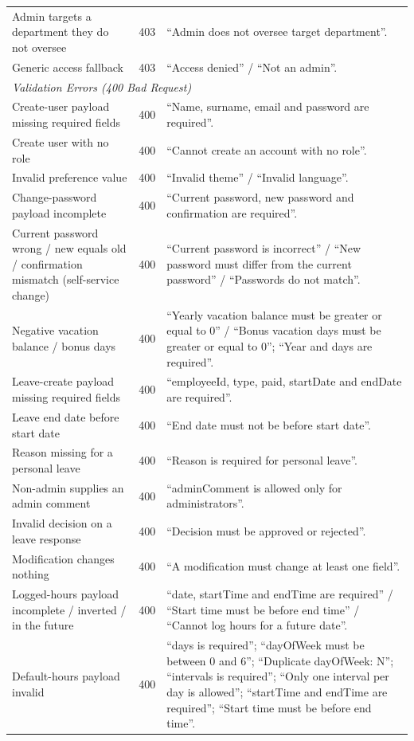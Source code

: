 \documentclass[11pt,a4paper]{article}
\begin{document}
\begin{longtable}{p{6cm} p{1.5cm} p{6cm}}
Admin targets a department they do not oversee & 403 & ``Admin does not oversee target department''. \\
Generic access fallback & 403 & ``Access denied'' / ``Not an admin''. \\
\midrule
\multicolumn{3}{l}{\textit{Validation Errors (400 Bad Request)}} \\
\midrule
Create-user payload missing required fields & 400 & ``Name, surname, email and password are required''. \\
Create user with no role & 400 & ``Cannot create an account with no role''. \\
Invalid preference value & 400 & ``Invalid theme'' / ``Invalid language''. \\
Change-password payload incomplete & 400 & ``Current password, new password and confirmation are required''. \\
Current password wrong / new equals old / confirmation mismatch (self-service change) & 400 & ``Current password is incorrect'' / ``New password must differ from the current password'' / ``Passwords do not match''. \\
Negative vacation balance / bonus days & 400 & ``Yearly vacation balance must be greater or equal to 0'' / ``Bonus vacation days must be greater or equal to 0''; ``Year and days are required''. \\
Leave-create payload missing required fields & 400 & ``employeeId, type, paid, startDate and endDate are required''. \\
Leave end date before start date & 400 & ``End date must not be before start date''. \\
Reason missing for a personal leave & 400 & ``Reason is required for personal leave''. \\
Non-admin supplies an admin comment & 400 & ``adminComment is allowed only for administrators''. \\
Invalid decision on a leave response & 400 & ``Decision must be approved or rejected''. \\
Modification changes nothing & 400 & ``A modification must change at least one field''. \\
Logged-hours payload incomplete / inverted / in the future & 400 & ``date, startTime and endTime are required'' / ``Start time must be before end time'' / ``Cannot log hours for a future date''. \\
Default-hours payload invalid & 400 & ``days is required''; ``dayOfWeek must be between 0 and 6''; ``Duplicate dayOfWeek: N''; ``intervals is required''; ``Only one interval per day is allowed''; ``startTime and endTime are required''; ``Start time must be before end time''. \\

\end{longtable}
\end{document}

